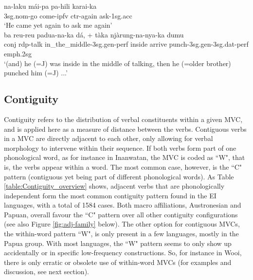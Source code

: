 \ea \label{kambera001}
\gll na-laku mái-pa pa-hili karai-ka \\
3\acs{sg}.\acs{nom}-go come-\acs{ipfv} \acs{ctr}-again ask-1\acs{sg}.\acs{acc} \\
\glft `He came yet again to ask me again' \\ 
\z
\xe
\ea \label{kambera002}
\gll ba reu-reu padua-na-ka dá, + tàka njàrung-na-nya-ka dumu \\
\acs{conj} \acs{rdp}-talk in\_the\_middle-3\acs{sg}.\acs{gen}-\acs{perf} inside arrive punch-3\acs{sg}.\acs{gen}-3\acs{sg}.\acs{dat}-\acs{perf} \acs{emph}.2\acs{sg} \\
\glft `(and) he (=J) was inside in the middle of talking, then he (=older brother) punched him (=J) ...' \\ 
\z
\xe

\subsection{Contiguity}\label{sec:contiguity}

Contiguity refers to the distribution of verbal constituents within a given MVC, and is applied here as a measure of distance between the verbs. Contiguous verbs in a MVC are directly adjacent to each other, only allowing for verbal morphology to intervene within their sequence. If both verbs form part of one phonological word, as for instance in Inanwatan, the MVC is coded as ``W", that is, the verbs appear within a word. The most common case, however, is the ``C" pattern (contiguous yet being part of different phonological words). As Table \ref{table:Contiguity_overview} shows, adjacent verbs that are phonologically independent form the most common contiguity pattern found in the EI languages, with a total of 1584 cases. Both macro affiliations, Austronesian and Papuan, overall favour the ``C" pattern over all other contiguity configurations (see also Figure \ref{fig:adj-family} below). The other option for contiguous MVCs, the within-word pattern ``W", is only present in a few languages, mostly in the Papua group. With most languages, the ``W" pattern seems to only show up accidentally or in specific low-frequency constructions. So, for instance in Wooi, there is only erratic or obsolete use of within-word MVCs (for examples and discussion, see next section).


